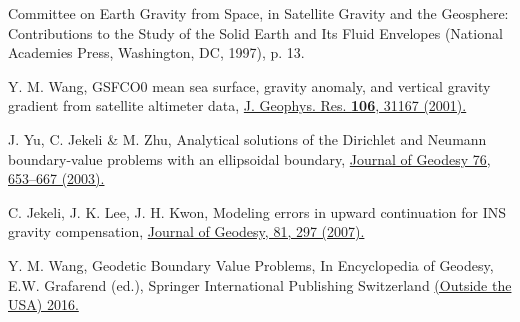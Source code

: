 \documentclass[twocolumn,showpacs,preprintnumbers]{revtex4}
\begin{document}
\begin{thebibliography}{99}
 Committee on Earth Gravity from Space, in Satellite Gravity
and the Geosphere: Contributions to the Study of the Solid Earth and Its
Fluid Envelopes (National Academies Press, Washington, DC, 1997), p. 13.

 Y. M. Wang, GSFCO0 mean sea surface, gravity anomaly, and
vertical gravity gradient from satellite altimeter data, \href{https://doi.org/10.1029/2000JC000470}%
{J. Geophys. Res. \textbf{106}, 31167 (2001).}

 J. Yu, C. Jekeli \& M. Zhu, Analytical solutions of the
Dirichlet and Neumann boundary-value problems with an ellipsoidal boundary, 
\href{https://doi.org/10.1007/s00190-002-0271-8}{Journal of Geodesy 76,
653--667 (2003). }

 C. Jekeli, J. K. Lee, J. H. Kwon, Modeling errors in upward
continuation for INS gravity compensation, \href{https://doi.org/10.1007/s00190-006-0108-y}%
{Journal of Geodesy, 81, 297 (2007).}

 Y. M. Wang, Geodetic Boundary Value Problems, In Encyclopedia
of Geodesy, E.W. Grafarend (ed.), Springer International Publishing
Switzerland \href{https://doi.org/10.1007/978-3-319-02370-0_42-1}{(Outside
the USA) 2016.}
\end{thebibliography}
\end{document}
